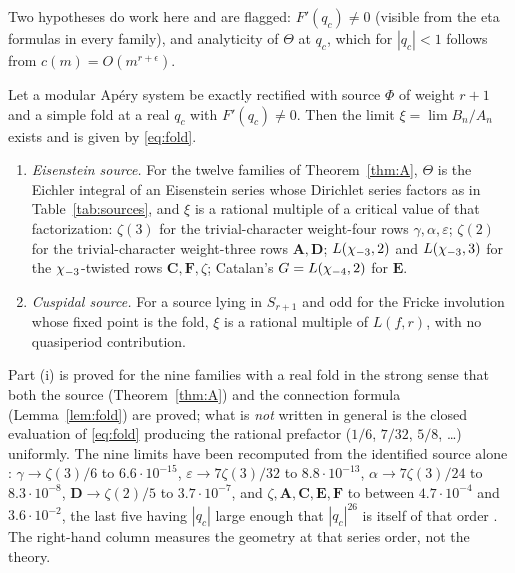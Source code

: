 Two hypotheses do work here and are flagged: $F'(q_c)\neq0$ (visible from the
eta formulas in every family), and analyticity of $\Theta$ at $q_c$, which for
$|q_c|<1$ follows from $c(m)=O(m^{r+\epsilon})$.

\begin{namedthm}[Ap\'ery limit $=$ critical value]\label{thm:B}
Let a modular Ap\'ery system be exactly rectified with source $\Phi$ of weight
$r+1$ and a simple fold at a real $q_c$ with $F'(q_c)\neq0$.  Then the limit
$\xi=\lim B_n/A_n$ exists and is given by \eqref{eq:fold}.
\begin{enumerate}[label=\textup{(\roman*)},leftmargin=2.4em]
\item \emph{Eisenstein source.}  For the twelve families of
Theorem~\ref{thm:A}, $\Theta$ is the Eichler integral of an Eisenstein series
whose Dirichlet series factors as in Table~\ref{tab:sources}, and $\xi$ is a
rational multiple of a critical value of that factorization: $\zeta(3)$ for the
trivial-character weight-four rows $\gamma,\alpha,\varepsilon$; $\zeta(2)$ for
the trivial-character weight-three rows $\mathbf A,\mathbf D$;
$L(\chi_{-3},2)$ and $L(\chi_{-3},3)$ for the $\chi_{-3}$-twisted rows
$\mathbf C,\mathbf F,\zeta$; Catalan's $G=L(\chi_{-4},2)$ for $\mathbf E$.
\item \emph{Cuspidal source.}  For a source lying in $S_{r+1}$ and odd for the
Fricke involution whose fixed point is the fold, $\xi$ is a rational multiple
of $L(f,r)$, with no quasiperiod contribution.
\end{enumerate}
\end{namedthm}

Part (i) is proved for the nine families with a real fold in the strong sense
that both the source (Theorem~\ref{thm:A}) and the connection formula
(Lemma~\ref{lem:fold}) are proved; what is \emph{not} written in general is
the closed evaluation of \eqref{eq:fold} producing the rational prefactor
($1/6$, $7/32$, $5/8$, \dots) uniformly.  The nine limits have been recomputed
from the identified source alone
: $\gamma\to\zeta(3)/6$ to $6.6\cdot10^{-15}$,
$\varepsilon\to7\zeta(3)/32$ to $8.8\cdot10^{-13}$,
$\alpha\to7\zeta(3)/24$ to $8.3\cdot10^{-8}$, $\mathbf D\to\zeta(2)/5$ to
$3.7\cdot10^{-7}$, and $\zeta,\mathbf A,\mathbf C,\mathbf E,\mathbf F$ to
between $4.7\cdot10^{-4}$ and $3.6\cdot10^{-2}$, the last five having $|q_c|$
large enough that $|q_c|^{26}$ is itself of that order
\cite[Tab.~2]{ProjSources}.  The right-hand column measures the geometry at
that series order, not the theory.

